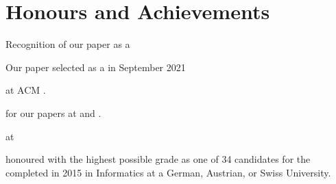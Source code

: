 \section{Honours and Achievements}
\begin{cvitemize}
    \item Recognition of our  paper as a 
    \item Our  paper selected as a  in September 2021
    \item {} at ACM .
    \item {} for our papers at  and .
    \item {} at
        \begin{inlineItemize}
        \item {}
        \item {}
        \item {}
        \end{inlineItemize}
    \item {} honoured with the highest possible grade \newline
           as one of 34 candidates for the  completed in 2015 in Informatics at a German, Austrian, or Swiss University.
\end{cvitemize}